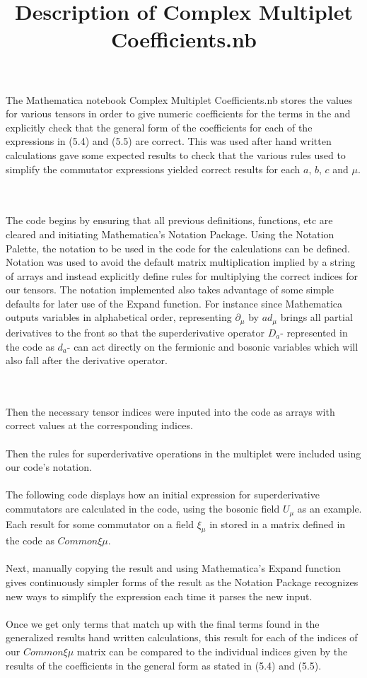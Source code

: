 \documentclass[a4paper]{article}
\title{Description of Complex Multiplet Coefficients.nb}
\begin{document}
\maketitle

The Mathematica notebook Complex Multiplet Coefficients.nb stores the values for various tensors in order to give numeric coefficients for the terms in the and explicitly check that the general form of the coefficients for each of the expressions in (5.4) and (5.5) are correct. This was used after hand written calculations gave some expected results to check that the various rules used to simplify the commutator expressions yielded correct results for each $a$, $b$, $c$ and $\mu$. 

\\
\\
\indent
The code begins by ensuring that all previous definitions, functions, etc are cleared and initiating Mathematica's Notation Package. Using the Notation Palette, the notation to be used in the code for the calculations can be defined. Notation was used to avoid the default matrix multiplication implied by a string of arrays and instead explicitly define rules for multiplying the correct indices for our tensors. The notation implemented also takes advantage of some simple defaults for later use of the Expand function. For instance since Mathematica outputs variables in alphabetical order, representing $\partial_\mu$ by $ad_\mu$ brings all partial derivatives to the front so that the superderivative operator $D_a$- represented in the code as $d_a$- can act directly on the fermionic and bosonic variables which will also fall after the derivative operator. 


\\
\\
\indent
Then the necessary tensor indices were inputed into the code as arrays with correct values at the corresponding indices.
\\
\\
\indent
Then the rules for superderivative operations in the multiplet were included using our code's notation.
\\
\\
\indent
The following code displays how an initial expression for superderivative commutators are calculated in the code, using the bosonic field $U_\mu$ as an example. Each result for some commutator on a field $\xi_\mu$ in stored in a matrix defined in the code as $Common\xi\mu$. 
\\
\\
\indent
Next, manually copying the result and using Mathematica's Expand function gives continuously simpler forms of the result as the Notation Package recognizes new ways to simplify the expression each time it parses the new input.
\\
\\
\indent
Once we get only terms that match up with the final terms found in the generalized results hand written calculations, this result for each of the indices of our $Common\xi\mu$ matrix can be compared to the individual indices given by the results of the coefficients in the general form as stated in (5.4) and (5.5).
\end{document}
